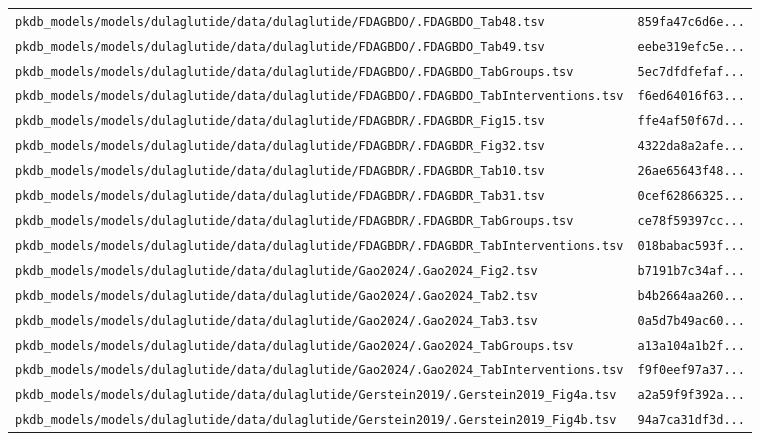 \begin{longtable}{ll}
\texttt{pkdb\_models/models/dulaglutide/data/dulaglutide/FDAGBDO/.FDAGBDO\_Tab48.tsv} & \texttt{859fa47c6d6e...} \\
\texttt{pkdb\_models/models/dulaglutide/data/dulaglutide/FDAGBDO/.FDAGBDO\_Tab49.tsv} & \texttt{eebe319efc5e...} \\
\texttt{pkdb\_models/models/dulaglutide/data/dulaglutide/FDAGBDO/.FDAGBDO\_TabGroups.tsv} & \texttt{5ec7dfdfefaf...} \\
\texttt{pkdb\_models/models/dulaglutide/data/dulaglutide/FDAGBDO/.FDAGBDO\_TabInterventions.tsv} & \texttt{f6ed64016f63...} \\
\texttt{pkdb\_models/models/dulaglutide/data/dulaglutide/FDAGBDR/.FDAGBDR\_Fig15.tsv} & \texttt{ffe4af50f67d...} \\
\texttt{pkdb\_models/models/dulaglutide/data/dulaglutide/FDAGBDR/.FDAGBDR\_Fig32.tsv} & \texttt{4322da8a2afe...} \\
\texttt{pkdb\_models/models/dulaglutide/data/dulaglutide/FDAGBDR/.FDAGBDR\_Tab10.tsv} & \texttt{26ae65643f48...} \\
\texttt{pkdb\_models/models/dulaglutide/data/dulaglutide/FDAGBDR/.FDAGBDR\_Tab31.tsv} & \texttt{0cef62866325...} \\
\texttt{pkdb\_models/models/dulaglutide/data/dulaglutide/FDAGBDR/.FDAGBDR\_TabGroups.tsv} & \texttt{ce78f59397cc...} \\
\texttt{pkdb\_models/models/dulaglutide/data/dulaglutide/FDAGBDR/.FDAGBDR\_TabInterventions.tsv} & \texttt{018babac593f...} \\
\texttt{pkdb\_models/models/dulaglutide/data/dulaglutide/Gao2024/.Gao2024\_Fig2.tsv} & \texttt{b7191b7c34af...} \\
\texttt{pkdb\_models/models/dulaglutide/data/dulaglutide/Gao2024/.Gao2024\_Tab2.tsv} & \texttt{b4b2664aa260...} \\
\texttt{pkdb\_models/models/dulaglutide/data/dulaglutide/Gao2024/.Gao2024\_Tab3.tsv} & \texttt{0a5d7b49ac60...} \\
\texttt{pkdb\_models/models/dulaglutide/data/dulaglutide/Gao2024/.Gao2024\_TabGroups.tsv} & \texttt{a13a104a1b2f...} \\
\texttt{pkdb\_models/models/dulaglutide/data/dulaglutide/Gao2024/.Gao2024\_TabInterventions.tsv} & \texttt{f9f0eef97a37...} \\
\texttt{pkdb\_models/models/dulaglutide/data/dulaglutide/Gerstein2019/.Gerstein2019\_Fig4a.tsv} & \texttt{a2a59f9f392a...} \\
\texttt{pkdb\_models/models/dulaglutide/data/dulaglutide/Gerstein2019/.Gerstein2019\_Fig4b.tsv} & \texttt{94a7ca31df3d...} \\

\end{longtable}
